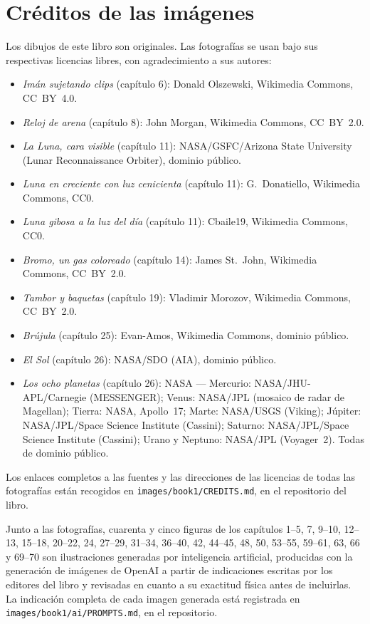 \chapter*{Créditos de las imágenes}

Los dibujos de este libro son originales. Las fotografías se usan bajo
sus respectivas licencias libres, con agradecimiento a sus autores:

\begin{itemize}
  \item \emph{Imán sujetando clips} (capítulo 6): Donald
        Olszewski, Wikimedia Commons, CC~BY~4.0.
  \item \emph{Reloj de arena} (capítulo 8): John Morgan, Wikimedia
        Commons, CC~BY~2.0.
  \item \emph{La Luna, cara visible} (capítulo 11): NASA/GSFC/Arizona
        State University (Lunar Reconnaissance Orbiter), dominio
        público.
  \item \emph{Luna en creciente con luz cenicienta} (capítulo 11):
        G.~Donatiello, Wikimedia Commons, CC0.
  \item \emph{Luna gibosa a la luz del día} (capítulo 11): Cbaile19,
        Wikimedia Commons, CC0.
  \item \emph{Bromo, un gas coloreado} (capítulo 14): James
        St.~John, Wikimedia Commons, CC~BY~2.0.
  \item \emph{Tambor y baquetas} (capítulo 19): Vladimir Morozov,
        Wikimedia Commons, CC~BY~2.0.
  \item \emph{Brújula} (capítulo 25): Evan-Amos, Wikimedia Commons,
        dominio público.
  \item \emph{El Sol} (capítulo 26): NASA/SDO (AIA), dominio
        público.
  \item \emph{Los ocho planetas} (capítulo 26): NASA ---
        Mercurio: NASA/JHU-APL/Carnegie (MESSENGER); Venus:
        NASA/JPL (mosaico de radar de Magellan); Tierra: NASA,
        Apollo~17; Marte: NASA/USGS (Viking); Júpiter:
        NASA/JPL/Space Science Institute (Cassini); Saturno:
        NASA/JPL/Space Science Institute (Cassini); Urano y
        Neptuno: NASA/JPL (Voyager~2). Todas de dominio público.
\end{itemize}

Los enlaces completos a las fuentes y las direcciones de las licencias
de todas las fotografías están recogidos en
\texttt{images/book1/CREDITS.md}, en el repositorio del libro.

\bigskip
Junto a las fotografías, cuarenta y cinco figuras de los capítulos
1--5, 7, 9--10, 12--13, 15--18, 20--22, 24, 27--29, 31--34, 36--40,
42, 44--45, 48, 50, 53--55, 59--61, 63, 66 y 69--70 son ilustraciones
generadas por inteligencia artificial, producidas con la generación de
imágenes de OpenAI a partir de indicaciones escritas por los editores
del libro y revisadas en cuanto a su exactitud física antes de
incluirlas. La indicación completa de cada imagen generada está
registrada en \texttt{images/book1/ai/PROMPTS.md}, en el repositorio.
\clearpage
